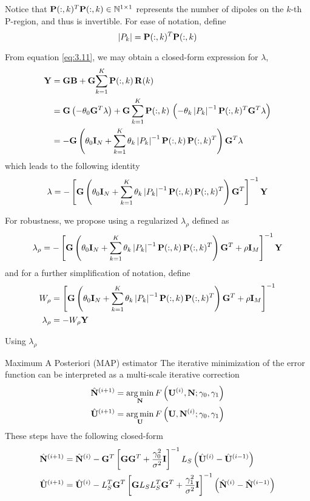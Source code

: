 Notice that $\mathbf{P}(:,k)^T \mathbf{P}(:,k) \in \mathbb{N}^{1\times 1}$ represents the number of dipoles on the $k$-th P-region, and thus is invertible.
%
For ease of notation, define
\begin{equation}
    \left| {P_k} \right| = \mathbf{P}(:,k)^T \mathbf{P}(:,k)
\end{equation}

From equation \eqref{eq:3.11}, we may obtain a closed-form expression for $\lambda$,
\begin{align}
    \mathbf{Y}
    &=
    \mathbf{G} \mathbf{B} + \mathbf{G} { \sum_{k=1}^K { \mathbf{P}(:,k)\, \mathbf{R}(k) } }
    \nonumber \\
    &=
    \mathbf{G}\left( -\theta_0 \mathbf{G}^T \lambda \right)
    + \mathbf{G} \sum_{k=1}^K
    { \mathbf{P}(:,k)\, \left( -\theta_k \left| {P_k} \right|^{-1} \mathbf{P}(:,k)^T \mathbf{G}^T \lambda \right)}
    \nonumber \\
    &=
    -\mathbf{G} \left(  \theta_0 \mathbf{I}_N + \sum_{k=1}^K \theta_k \left| {P_k} \right|^{-1} 
    \mathbf{P}(:,k)\, \mathbf{P}(:,k)^T
     \right) \mathbf{G}^T \lambda
\end{align}
which leads to the following identity
\begin{equation}
    \lambda
    =
    -\left[ \mathbf{G} \left(  \theta_0 \mathbf{I}_N + \sum_{k=1}^K \theta_k \left| {P_k} \right|^{-1} 
    \mathbf{P}(:,k)\, \mathbf{P}(:,k)^T
     \right) \mathbf{G}^T \right]^{-1} \mathbf{Y}
\end{equation}

For robustness, we propose using a regularized $\lambda_\rho$ defined as
\begin{equation}
    \lambda_\rho
    =
    -\left[ \mathbf{G} \left(  \theta_0 \mathbf{I}_N + \sum_{k=1}^K \theta_k \left| {P_k} \right|^{-1} 
    \mathbf{P}(:,k)\, \mathbf{P}(:,k)^T
     \right) \mathbf{G}^T + \rho \mathbf{I}_M  \right]^{-1} \mathbf{Y}
\end{equation}
and for a further simplification of notation, define
\begin{align}
    W_\rho &=
    \left[ \mathbf{G} \left(  \theta_0 \mathbf{I}_N + \sum_{k=1}^K \theta_k \left| {P_k} \right|^{-1} 
    \mathbf{P}(:,k)\, \mathbf{P}(:,k)^T
     \right) \mathbf{G}^T + \rho \mathbf{I}_M  \right]^{-1}
    \\
    \lambda_\rho &= -W_\rho  \mathbf{Y}
\end{align}

Using $\lambda_\rho$ 




 {Maximum A Posteriori (MAP) estimator}
    The iterative minimization of the error function can be interpreted as a multi-scale iterative correction
    \begin{align}
        \hat{\mathbf{N}}^{(i+1)} &= \operatorname*{arg\,min}_{\mathbf{N}} F\left( \mathbf{U}^{(i)},\mathbf{N}; \gamma_0, \gamma_1 \right)
        \\
        \hat{\mathbf{U}}^{(i+1)} &= \operatorname*{arg\,min}_{\mathbf{U}} F\left( \mathbf{U},\mathbf{N}^{(i)}; \gamma_0, \gamma_1 \right)
    \end{align}
    These steps have the following closed-form
    \begin{align}
        \hat{\mathbf{N}}^{(i+1)} &=
        \hat{\mathbf{N}}^{(i)}
        -
        \mathbf{G}^T \left[ \mathbf{G} \mathbf{G}^T + \frac{\gamma_0^2}{\sigma^2} \mathbf{I} \right]^{-1} L_S \left( \hat{\mathbf{U}}^{(i)}-\hat{\mathbf{U}}^{(i-1)}  \right)
        \\
        \hat{\mathbf{U}}^{(i+1)} &=
        \hat{\mathbf{U}}^{(i)}
        -
        L_S^T \mathbf{G}^T \left[ \mathbf{G} L_S L_S^T \mathbf{G}^T + \frac{\gamma_1^2}{\sigma^2} \mathbf{I} \right]^{-1} \left( \hat{\mathbf{N}}^{(i)}-\hat{\mathbf{N}}^{(i-1)}  \right)
    \end{align}

